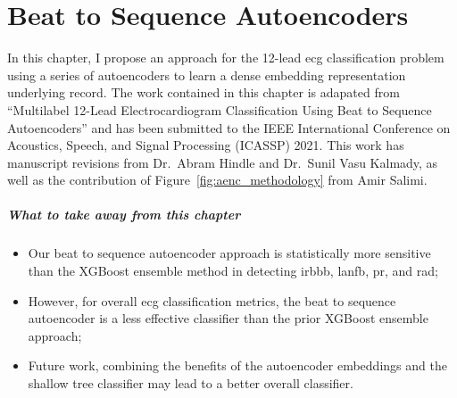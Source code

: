 \documentclass[\main/thesis.tex]{subfiles}
\begin{document}
\chapter{Beat to Sequence Autoencoders}
\label{chp:dl_autoenc}

In this chapter, I propose an approach for the 12-lead \gls{ecg} classification problem using a series of autoencoders to learn a dense embedding representation underlying record.
The work contained in this chapter is adapated from ``Multilabel 12-Lead Electrocardiogram Classification Using Beat to Sequence Autoencoders'' and has been submitted to the IEEE International Conference on Acoustics, Speech, and Signal Processing (ICASSP) 2021.
This work has manuscript revisions from Dr.\ Abram Hindle and Dr.\ Sunil Vasu Kalmady, as well as the contribution of Figure~\ref{fig:aenc_methodology} from Amir Salimi.

\paragraph{What to take away from this chapter}
\begin{itemize}
    \item Our beat to sequence autoencoder approach is statistically more sensitive than the XGBoost ensemble method in detecting \gls{irbbb}, \gls{lanfb}, \gls{pr}, and \gls{rad};
    \item However, for overall \gls{ecg} classification metrics, the beat to sequence autoencoder is a less effective classifier than the prior XGBoost ensemble approach;
    \item Future work, combining the benefits of the autoencoder embeddings and the shallow tree classifier may lead to a better overall classifier.
\end{itemize}

\end{document}
